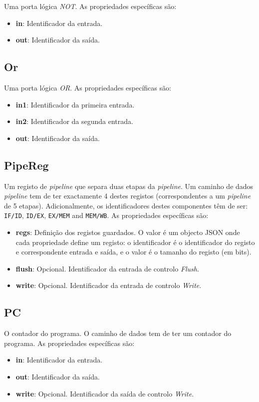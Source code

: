 \documentclass[11pt,a4paper,twoside,titlepage]{report}
\begin{document}
Uma porta lógica \emph{NOT}. As propriedades específicas são:
\begin{itemize}
	\item \textbf{in}: Identificador da entrada.
	\item \textbf{out}: Identificador da saída.
\end{itemize}

\subsection{Or}

Uma porta lógica \emph{OR}. As propriedades específicas são:
\begin{itemize}
	\item \textbf{in1}: Identificador da primeira entrada.
	\item \textbf{in2}: Identificador da segunda entrada.
	\item \textbf{out}: Identificador da saída.
\end{itemize}

\subsection{PipeReg}

Um registo de \emph{pipeline} que separa duas etapas da \emph{pipeline}.
Um caminho de dados \emph{pipeline} tem de ter exactamente 4 destes registos
(correspondentes a um \emph{pipeline} de 5 etapas). Adicionalmente, os
identificadores destes componentes têm de ser:
\verb+IF/ID+, \verb+ID/EX+, \verb+EX/MEM+ and \verb+MEM/WB+.
As propriedades específicas são:
\begin{itemize}
	\item \textbf{regs}: Definição dos registos guardados. O valor é um objecto
		JSON onde cada propriedade define um registo: o identificador é o
		identificador do registo e correspondente entrada e saída, e o valor é o
		tamanho do registo (em bits).
	\item \textbf{flush}: Opcional. Identificador da entrada de controlo \emph{Flush}.
	\item \textbf{write}: Opcional. Identificador da entrada de controlo \emph{Write}.
\end{itemize}

\subsection{PC}

O contador do programa. O caminho de dados tem de ter um contador do programa.
As propriedades específicas são:
\begin{itemize}
	\item \textbf{in}: Identificador da entrada.
	\item \textbf{out}: Identificador da saída.
	\item \textbf{write}: Opcional. Identificador da saída de controlo \emph{Write}.
\end{itemize}
\end{document}
